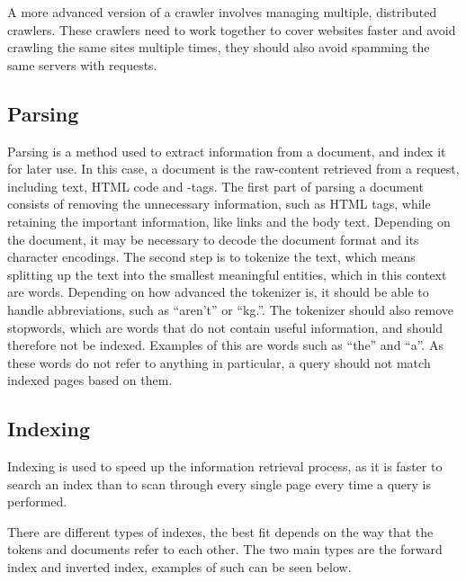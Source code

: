 A more advanced version of a crawler involves managing multiple, distributed
crawlers. These crawlers need to work together to cover websites faster and
avoid crawling the same sites multiple times, they should also avoid spamming
the same servers with requests.


\subsection{Parsing} \label{sec:parsing}
Parsing is a method used to extract information from a document, and index it
for later use. In this case, a document is the raw-content retrieved from a request,
including text, HTML code and -tags.
The first part of parsing a document consists of removing the unnecessary
information, such as HTML tags, while retaining the important information, like
links and the body text. Depending on the document, it may be necessary to
decode the document format and its character encodings.
The second step is to tokenize the text, which means splitting up the text into
the smallest meaningful entities, which in this context are words. Depending on
how advanced the tokenizer is, it should be able to handle abbreviations, such
as ``aren't'' or ``kg.''. The tokenizer should also remove stopwords, which are
words that do not contain useful information, and should therefore not
be indexed. Examples of this are words such as ``the'' and ``a''. As these words
do not refer to anything in particular, a query should not match indexed pages
based on them.

\subsection{Indexing}
Indexing is used to speed up the information retrieval process, as it is faster
to search an index than to scan through every single page every time a query is
performed.

There are different types of indexes, the best fit depends on the way
that the tokens and documents refer to each other. The two main types are the
forward index and inverted index, examples of such can be seen below.

